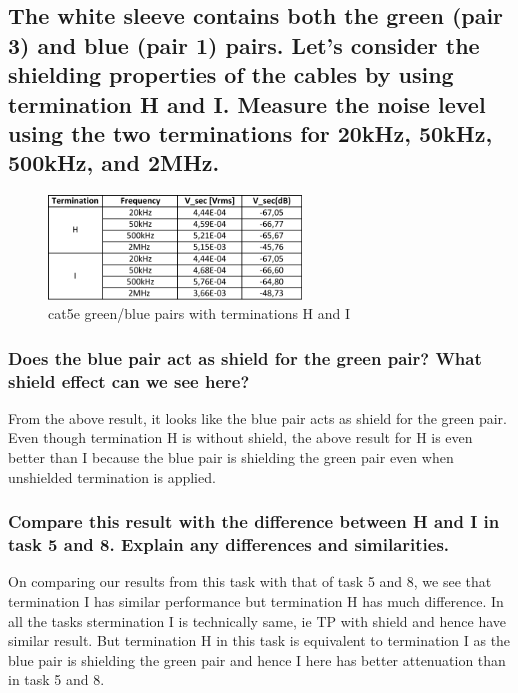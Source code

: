 \documentclass[12pt,a4paper,UKenglish]{article}
\begin{document}
\subsection{The white sleeve contains both the green (pair 3) and blue (pair 1) pairs. Let's consider the shielding properties of the cables by using termination H and I. Measure the noise level using the two terminations for 20kHz, 50kHz, 500kHz, and 2MHz.}
\begin{figure} [H] %
  \centering 
  \includegraphics[width=0.6\textwidth]{img/task11c_data.pdf} 
  \caption{cat5e green/blue pairs with terminations H and I}
  \label{fig:task11c} 
\end{figure}
\subsubsection{Does the blue pair act as shield for the green pair? What shield effect can we see here?}
From the above result, it looks like the blue pair acts as shield for the green pair. Even though termination H is without shield, the above result for H is even better than I because the blue pair is shielding the green pair even when unshielded termination is applied.
\subsubsection{Compare this result with the difference between H and I in task 5 and 8. Explain any differences and similarities.}
On comparing our results from this task with that of task 5 and 8, we see that termination I has similar performance but termination H has much difference. In all the tasks stermination I is technically same, ie TP with shield and hence have similar result. But termination H in this task is equivalent to termination I as the blue pair is shielding the green pair and hence I here has better attenuation than in task 5 and 8.
\end{document}
